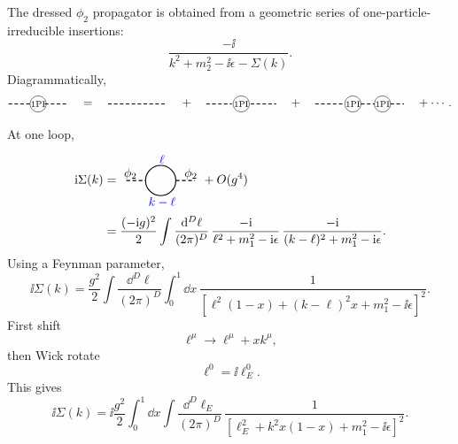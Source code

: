 The dressed \(\phi_2\) propagator is obtained from a geometric series of
one-particle-irreducible insertions:
\[
  \frac{-\ii}{k^2+m_2^2-\ii\epsilon-\Sigma(k)}.
\]
Diagrammatically,
\[
\begin{tikzpicture}[baseline=-0.45ex,scale=0.8,
  two/.style={dash pattern=on 3pt off 2pt,line width=0.8pt},
  blob/.style={draw,circle,minimum size=0.48cm,inner sep=0pt}]
  \draw[two] (-1.1,0) -- (-0.25,0);
  \node[blob] at (0,0) {\scriptsize 1PI};
  \draw[two] (0.25,0) -- (1.1,0);
\end{tikzpicture}
\quad = \quad
\begin{tikzpicture}[baseline=-0.45ex,scale=0.8,
  two/.style={dash pattern=on 3pt off 2pt,line width=0.8pt}]
  \draw[two] (-1.1,0) -- (1.1,0);
\end{tikzpicture}
\quad + \quad
\begin{tikzpicture}[baseline=-0.45ex,scale=0.8,
  two/.style={dash pattern=on 3pt off 2pt,line width=0.8pt},
  blob/.style={draw,circle,minimum size=0.48cm,inner sep=0pt}]
  \draw[two] (-1.3,0) -- (-0.35,0);
  \node[blob] at (0,0) {\scriptsize 1PI};
  \draw[two] (0.35,0) -- (1.3,0);
\end{tikzpicture}
\quad + \quad
\begin{tikzpicture}[baseline=-0.45ex,scale=0.8,
  two/.style={dash pattern=on 3pt off 2pt,line width=0.8pt},
  blob/.style={draw,circle,minimum size=0.48cm,inner sep=0pt}]
  \draw[two] (-1.65,0) -- (-0.55,0);
  \node[blob] at (-0.25,0) {\scriptsize 1PI};
  \draw[two] (0.05,0) -- (0.55,0);
  \node[blob] at (0.85,0) {\scriptsize 1PI};
  \draw[two] (1.15,0) -- (1.65,0);
\end{tikzpicture}
\quad +\cdots .
\]

At one loop,
\[
\begin{aligned}
  \ii\Sigma(k)
  &=
  \begin{tikzpicture}[baseline=-0.55ex,scale=0.78,
    two/.style={dash pattern=on 3pt off 2pt,line width=0.8pt},
    one/.style={line width=0.8pt}]
    \draw[two] (-1.25,0) -- (-0.55,0);
    \draw[two] (0.55,0) -- (1.25,0);
    \draw[one] (0,0) circle (0.55);
    \node at (-1.1,0.25) {\(\phi_2\)};
    \node at (1.1,0.25) {\(\phi_2\)};
    \node[blue] at (0.05,0.78) {\(\ell\)};
    \node[blue] at (0.05,-0.78) {\(k-\ell\)};
  \end{tikzpicture}
  +O(g^4)
\\
  &=
  \frac{(-\ii g)^2}{2}
  \int\frac{\dd^D\ell}{(2\pi)^D}\,
  \frac{-\ii}{\ell^2+m_1^2-\ii\epsilon}\,
  \frac{-\ii}{(k-\ell)^2+m_1^2-\ii\epsilon}.
\end{aligned}
\]
Using a Feynman parameter,
\[
  \ii\Sigma(k)
  =
  \frac{g^2}{2}
  \int\frac{\dd^D\ell}{(2\pi)^D}\int_0^1\dd x\,
  \frac{1}{
  \left[\ell^2(1-x)+(k-\ell)^2x+m_1^2-\ii\epsilon\right]^2}.
\]
First shift
\[
  \ell^\mu\to \ell^\mu+xk^\mu,
\]
then Wick rotate
\[
  \ell^0=\ii\ell_E^0.
\]
This gives
\[
  \ii\Sigma(k)
  =
  \ii\frac{g^2}{2}
  \int_0^1\dd x
  \int\frac{\dd^D\ell_E}{(2\pi)^D}\,
  \frac{1}{
  \left[\ell_E^2+k^2x(1-x)+m_1^2-\ii\epsilon\right]^2}.
\]

